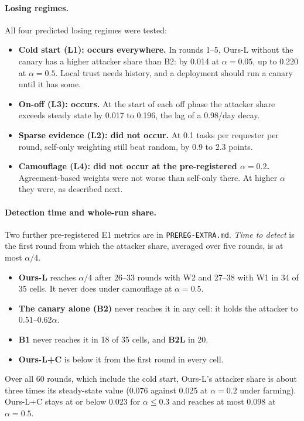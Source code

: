 \paragraph{Losing regimes.}
All four predicted losing regimes were tested:
\begin{itemize}
\item \textbf{Cold start (L1): occurs everywhere.} In rounds 1--5,
  Ours-L without the canary has a higher attacker share than B2: by
  0.014 at $\alpha{=}0.05$, up to 0.220 at $\alpha{=}0.5$. Local trust
  needs history, and a deployment should run a canary until it has some.
\item \textbf{On-off (L3): occurs.} At the start of each off phase the
  attacker share exceeds steady state by 0.017 to 0.196, the lag of a
  0.98/day decay.
\item \textbf{Sparse evidence (L2): did not occur.} At 0.1 tasks per
  requester per round, self-only weighting still beat random, by 0.9 to
  2.3 points.
\item \textbf{Camouflage (L4): did not occur at the pre-registered
  $\alpha{=}0.2$.} Agreement-based weights were not worse than self-only
  there. At higher $\alpha$ they were, as described next.
\end{itemize}

\paragraph{Detection time and whole-run share.}
Two further pre-registered E1 metrics are in \texttt{PREREG-EXTRA.md}.
\emph{Time to detect} is the first round from which the attacker share,
averaged over five rounds, is at most $\alpha/4$.
\begin{itemize}
\item \textbf{Ours-L} reaches $\alpha/4$ after 26--33 rounds with W2 and
  27--38 with W1 in 34 of 35 cells. It never does under camouflage at
  $\alpha{=}0.5$.
\item \textbf{The canary alone (B2)} never reaches it in any cell: it
  holds the attacker to $0.51$--$0.62\alpha$.
\item \textbf{B1} never reaches it in 18 of 35 cells, and \textbf{B2L}
  in 20.
\item \textbf{Ours-L+C} is below it from the first round in every cell.
\end{itemize}
Over all 60 rounds, which include the cold start, Ours-L's attacker share
is about three times its steady-state value (0.076 against 0.025 at
$\alpha{=}0.2$ under farming). Ours-L+C stays at or below 0.023 for
$\alpha\le0.3$ and reaches at most 0.098 at $\alpha{=}0.5$.

